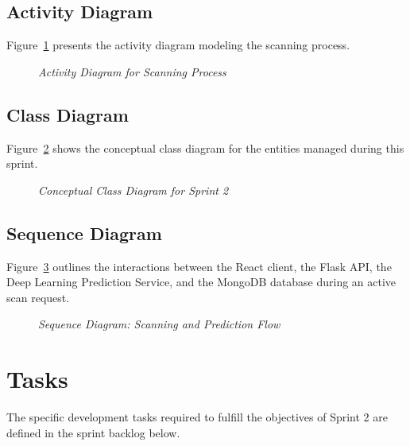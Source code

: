 \subsection{Activity Diagram}
Figure~\ref{fig:sprint2_activity} presents the activity diagram modeling the scanning process.

\begin{figure}[H]
	\centering
	\caption{\textit{Activity Diagram for Scanning Process}}
	\label{fig:sprint2_activity}
\end{figure}

\subsection{Class Diagram}
Figure~\ref{fig:sprint2_class} shows the conceptual class diagram for the entities managed during this sprint.

\begin{figure}[H]
	\centering
	\caption{\textit{Conceptual Class Diagram for Sprint 2}}
	\label{fig:sprint2_class}
\end{figure}

\subsection{Sequence Diagram}
Figure~\ref{fig:sprint2_seq_scan} outlines the interactions between the React client, the Flask API, the Deep Learning Prediction Service, and the MongoDB database during an active scan request.

\begin{figure}[H]
	\centering
	\caption{\textit{Sequence Diagram: Scanning and Prediction Flow}}
	\label{fig:sprint2_seq_scan}
\end{figure}

\section{Tasks}
The specific development tasks required to fulfill the objectives of Sprint 2 are defined in the sprint backlog below.

